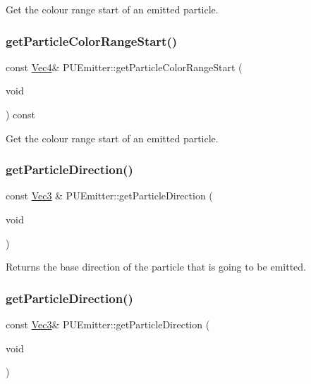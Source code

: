 Get the colour range start of an emitted particle. \mbox{\label{classPUEmitter_ac8272265219cb76a1fac1c76ef0295c4}} 
\subsubsection{\texorpdfstring{get\+Particle\+Color\+Range\+Start()}{getParticleColorRangeStart()}\hspace{0.1cm}{\footnotesize\ttfamily [2/2]}}
{\footnotesize\ttfamily const \hyperlink{classVec4}{Vec4}\& P\+U\+Emitter\+::get\+Particle\+Color\+Range\+Start (\begin{DoxyParamCaption}\item[{void}]{ }\end{DoxyParamCaption}) const}

Get the colour range start of an emitted particle. \mbox{\label{classPUEmitter_a9729a55ab2476e508a018f34a3e9992f}} 
\subsubsection{\texorpdfstring{get\+Particle\+Direction()}{getParticleDirection()}\hspace{0.1cm}{\footnotesize\ttfamily [1/2]}}
{\footnotesize\ttfamily const \hyperlink{classVec3}{Vec3} \& P\+U\+Emitter\+::get\+Particle\+Direction (\begin{DoxyParamCaption}\item[{void}]{ }\end{DoxyParamCaption})}

Returns the base direction of the particle that is going to be emitted. \mbox{\label{classPUEmitter_acece8a53bd063e9e985448dc06172ec2}} 
\subsubsection{\texorpdfstring{get\+Particle\+Direction()}{getParticleDirection()}\hspace{0.1cm}{\footnotesize\ttfamily [2/2]}}
{\footnotesize\ttfamily const \hyperlink{classVec3}{Vec3}\& P\+U\+Emitter\+::get\+Particle\+Direction (\begin{DoxyParamCaption}\item[{void}]{ }\end{DoxyParamCaption})}

